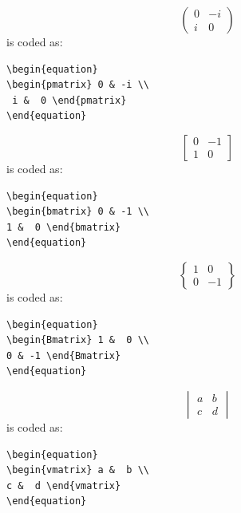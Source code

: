 \documentclass[lettersize,journal]{IEEEtran}
\begin{document}
\begin{equation}
\begin{pmatrix} 0 & -i \\
 i &  0 \end{pmatrix}
\end{equation}
is coded as:
\begin{verbatim}
\begin{equation}
\begin{pmatrix} 0 & -i \\
 i &  0 \end{pmatrix}
\end{equation}
\end{verbatim}

\begin{equation}
\begin{bmatrix} 0 & -1 \\
1 &  0 \end{bmatrix}
\end{equation}
is coded as:
\begin{verbatim}
\begin{equation}
\begin{bmatrix} 0 & -1 \\
1 &  0 \end{bmatrix}
\end{equation}
\end{verbatim}

\begin{equation}
\begin{Bmatrix} 1 &  0 \\
0 & -1 \end{Bmatrix}
\end{equation}
is coded as:
\begin{verbatim}
\begin{equation}
\begin{Bmatrix} 1 &  0 \\
0 & -1 \end{Bmatrix}
\end{equation}\end{verbatim}

\begin{equation}
\begin{vmatrix} a &  b \\
c &  d \end{vmatrix}
\end{equation}
is coded as:
\begin{verbatim}
\begin{equation}
\begin{vmatrix} a &  b \\
c &  d \end{vmatrix}
\end{equation}\end{verbatim}
\end{document}
